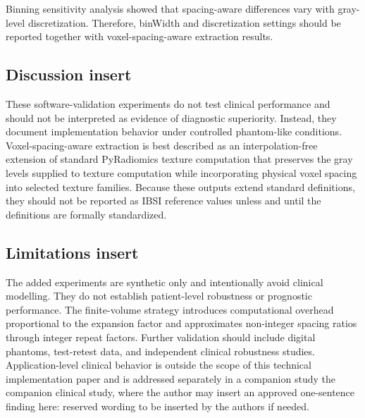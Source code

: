 Binning sensitivity analysis showed that spacing-aware differences vary with gray-level discretization. Therefore, binWidth and discretization settings should be reported together with voxel-spacing-aware extraction results.



\subsection*{Discussion insert}
These software-validation experiments do not test clinical performance and should not be interpreted as evidence of diagnostic superiority. Instead, they document implementation behavior under controlled phantom-like conditions. Voxel-spacing-aware extraction is best described as an interpolation-free extension of standard PyRadiomics texture computation that preserves the gray levels supplied to texture computation while incorporating physical voxel spacing into selected texture families. Because these outputs extend standard definitions, they should not be reported as IBSI reference values unless and until the definitions are formally standardized.

\subsection*{Limitations insert}
The added experiments are synthetic only and intentionally avoid clinical modelling. They do not establish patient-level robustness or prognostic performance. The finite-volume strategy introduces computational overhead proportional to the expansion factor and approximates non-integer spacing ratios through integer repeat factors. Further validation should include digital phantoms, test-retest data, and independent clinical robustness studies. Application-level clinical behavior is outside the scope of this technical implementation paper and is addressed separately in a companion study the companion clinical study, where the author may insert an approved one-sentence finding here: reserved wording to be inserted by the authors if needed.
